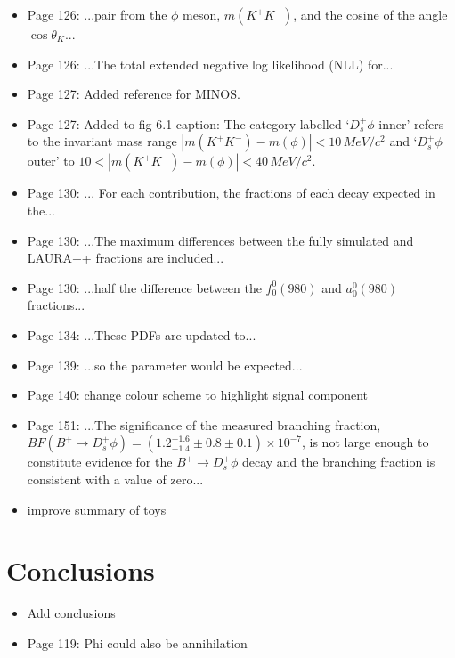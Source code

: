 \documentclass[12pt]{article}
\begin{document}
\begin{itemize}


\item Page 126: ...pair {\color{red}from} the $\phi$ meson, $m(K^+K^-)$, and the cosine of {\color{red}the} angle $\cos\theta_{K}$...
\item Page 126: ...The total extended {\color{red}negative log likelihood} (NLL) for...
\item Page 127: Added reference for MINOS.
\item Page 127: Added to fig 6.1 caption: {\color{red}The category labelled `$D_s^+\phi$ inner' refers to the invariant mass range $|m(K^+K^-)-m(\phi)|<10\,MeV/c^2$ and `$D_s^+\phi$  outer' to $10<|m(K^+K^-)-m(\phi)|<40\,MeV/c^2$.}
\item Page 130: ... {\color{red}For each contribution, the fractions of each decay} expected in the...
\item Page 130: ...The maximum differences {\color{red}between the fully simulated and LAURA++ fractions} are included...
\item Page 130: ...half the difference  {\color{red}between the $f_{0}^{0}(980)$ and $a_{0}^{0}(980)$ fractions}... 
\item Page 134: ...These PDFs are {\color{red}updated} to...
\item Page 139: ...so the {\color{red}parameter} would be expected...
\item Page 140: {\color{blue} change colour scheme to highlight signal component}
\item Page 151: ...The {\color{red}significance of} the measured branching fraction, $BF(B^+\rightarrow D_s^+\phi) = (1.2^{+1.6}_{-1.4} \pm 0.8  \pm 0.1)\times 10^{-7}$, is {\color{red}not large enough to constitute evidence} for the $B^+\rightarrow D_s^+\phi$ decay and {\color{red}the branching fraction is consistent with a value of zero}...
\item {\color{blue} improve summary of toys}

\end{itemize}
\section{Conclusions}

\begin{itemize}
\item {\color{blue}Add conclusions}
\item Page 119: {\color{blue} Phi could also be annihilation}

\end{itemize}
\end{document}
